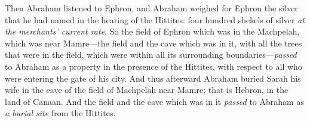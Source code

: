 \begin{biblechapter}
\verse Then Abraham listened to Ephron, and Abraham weighed for Ephron the silver that he had named in the hearing of the Hittites: four hundred shekels of silver \textit{at the merchants’ current rate}.
\verse So the field of Ephron which was in the Machpelah, which was near Mamre—the field and the cave which was in it, with all the trees that were in the field, which were within all its surrounding boundaries—\textit{passed}
\verse to Abraham as a property in the presence of the Hittites, with respect to all who were entering the gate of his city.
\verse And thus afterward Abraham buried Sarah his wife in the cave of the field of Machpelah near Mamre; that is Hebron, in the land of Canaan.
\verse And the field and the cave which was in it \textit{passed} to Abraham as \textit{a burial site} from the Hittites.
\end{biblechapter}

